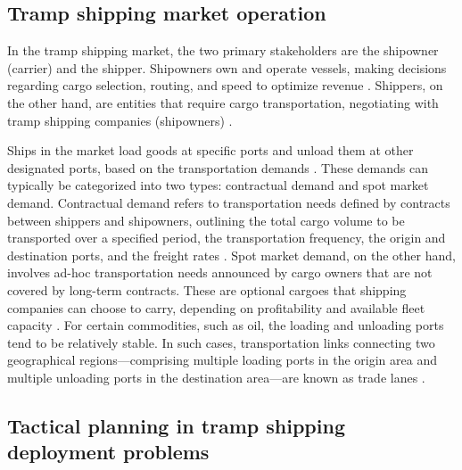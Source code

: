 \documentclass[11pt,english]{article}
\begin{document}
\subsection{Tramp shipping market operation}
\label{sec:tramp_market}

In the tramp shipping market, the two primary stakeholders are the shipowner (carrier) and the shipper. Shipowners own and operate vessels, making decisions regarding cargo selection, routing, and speed to optimize revenue \citep{wu2021robust}. Shippers, on the other hand, are entities that require cargo transportation, negotiating with tramp shipping companies (shipowners) \citep{meng2015tailored}.

Ships in the market load goods at specific ports and unload them at other designated ports, based on the transportation demands \citep{staalhane2015branch, branchini2015routing}. These demands can typically be categorized into two types: contractual demand and spot market demand. Contractual demand refers to transportation needs defined by contracts between shippers and shipowners, outlining the total cargo volume to be transported over a specified period, the transportation frequency, the origin and destination ports, and the freight rates \citep{norstad2011tramp, christiansen2007maritime, bronmo2007multi}. Spot market demand, on the other hand, involves ad-hoc transportation needs announced by cargo owners that are not covered by long-term contracts. These are optional cargoes that shipping companies can choose to carry, depending on profitability and available fleet capacity \citep{norstad2011tramp}. For certain commodities, such as oil, the loading and unloading ports tend to be relatively stable. In such cases, transportation links connecting two geographical regions—comprising multiple loading ports in the origin area and multiple unloading ports in the destination area—are known as trade lanes \citep{gu2019can}.

\subsection{Tactical planning in tramp shipping deployment problems}
\label{sec:plan}
\end{document}
